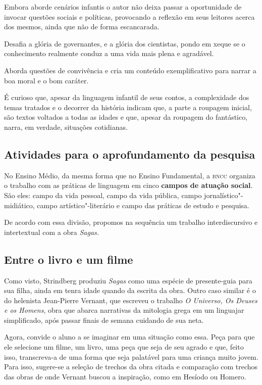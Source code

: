 \documentclass[12pt]{extarticle}
\begin{document}
Embora aborde cenários infantis o autor não deixa passar a oportunidade
de invocar questões sociais e políticas, provocando a reflexão em seus
leitores acerca dos mesmos, ainda que não de forma escancarada.

Desafia a glória de governantes, e a glória dos cientistas, pondo em
xeque se o conhecimento realmente conduz a uma vida mais plena e
agradável.

Aborda questões de convivência e cria um conteúdo exemplificativo para
narrar a boa moral e o bom caráter.

É curioso que, apesar da linguagem infantil de seus contos, a
complexidade dos temas tratados e o decorrer da história indicam que, a
parte a roupagem inicial, são textos voltados a todas as idades e que,
apesar da roupagem do fantástico, narra, em verdade, situações
cotidianas.

\subsection{Atividades para o aprofundamento da pesquisa}


No Ensino Médio, da mesma forma que no Ensino Fundamental, a \textsc{bncc}
organiza o trabalho com as práticas de linguagem em cinco \textbf{campos
de atuação social}. São eles: campo da vida pessoal, campo da vida
pública, campo jornalístico"-midiático, campo artístico"-literário e campo
das práticas de estudo e pesquisa.

De acordo com essa divisão, propomos na sequência um trabalho
interdiscursivo e intertextual com a obra \emph{Sagas.}



\subsection{Entre o livro e um filme}


Como visto, Strindberg produziu \emph{Sagas} como uma espécie de
presente-guia para sua filha, ainda em tenra idade quando da escrita
da obra. Outro caso similar é o do helenista Jean-Pierre Vernant, que
escreveu o trabalho \emph{O Universo, Os Deuses e os Homens}, obra que
abarca narrativas da mitologia grega em um linguajar simplificado,
após passar finais de semana cuidando de sua neta.

Agora, convide o aluno a se imaginar em uma situação como essa. Peça
para que ele selecione um filme, um livro, uma peça que seja de seu
agrado e que, feito isso, transcreva-a de uma forma que seja palatável
para uma criança muito jovem. Para isso, sugere-se a seleção de trechos
da obra citada e comparação com trechos das obras de onde Vernant buscou
a inspiração, como em Hesíodo ou Homero.
\end{document}
